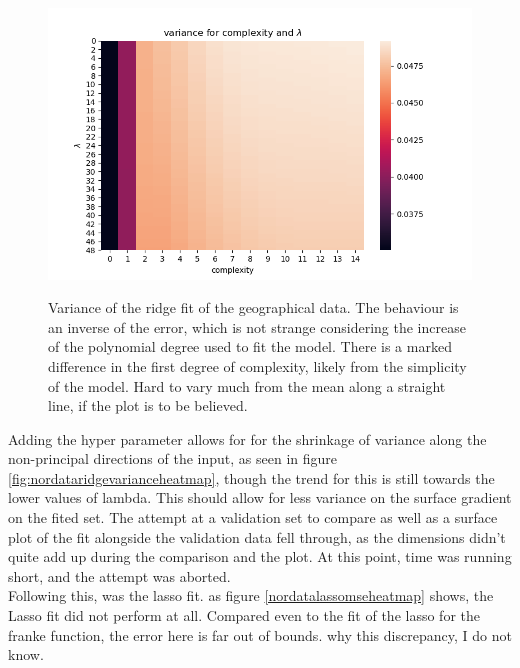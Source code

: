 \documentclass[ 12pt, a4paper ]{article}
\begin{document}
\begin{figure}[H]
\includegraphics[scale=0.7]{nordataridgevarianceheatmap.png}
\label{fig:nordatareidgevarianceheatmap}
\caption{
    Variance of the ridge fit of the geographical data. The behaviour is an inverse of the error,
    which is not strange considering the increase of the polynomial degree used to fit the model.
    There is a marked difference in the first degree of complexity, likely from the simplicity
    of the model. Hard to vary much from the mean along a straight line, if the plot is to be 
    believed. 
}
\end{figure}

Adding the hyper parameter allows for for the shrinkage of variance along the non-principal 
directions of the input, as seen in figure \ref{fig:nordataridgevarianceheatmap}, though the trend
for this is still towards the lower values of lambda. This should allow for less variance on the 
surface gradient on the fited set. The attempt at a validation set to compare as well as a 
surface plot of the fit alongside the validation data fell through, as the dimensions didn't 
quite add up during the comparison and the plot. At this point, time was running short, and the
attempt was aborted. \\

Following this, was the lasso fit. as figure \ref{nordatalassomseheatmap} shows, the Lasso fit 
did not perform at all. Compared even to the fit of the lasso for the franke function, the error 
here is far out of bounds. why this discrepancy, I do not know. 
\end{document}
